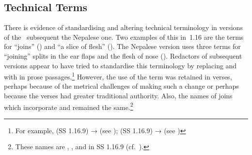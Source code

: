 


\subsection{Technical Terms}

There is evidence of standardising and altering technical terminology in versions
of the \SS\ subsequent the Nepalese one. Two examples of this in \SS\,1.16 are the
terms for “joins” () and “a slice of flesh”
(). The Nepalese version uses three
terms for “joining” splits in the ear flaps and the flesh of nose (). Redactors of 
    subsequent
versions appear to have tried to standardise this terminology by replacing
 and  with  in prose passages.\footnote{For
    example,  (SS 1.16.9) → 
    (see );  (SS 1.16.9) →
     (see )} However, the use of the term
     was retained in verses, perhaps because of the metrical challenges
    of making such a change or perhaps because the verses 
    had greater traditional authority. Also, the names of joins which incorporate 
    and  remained the same.\footnote{These names are 
    ,
        , and  in SS 1.16.9 (cf.\
        ).}

